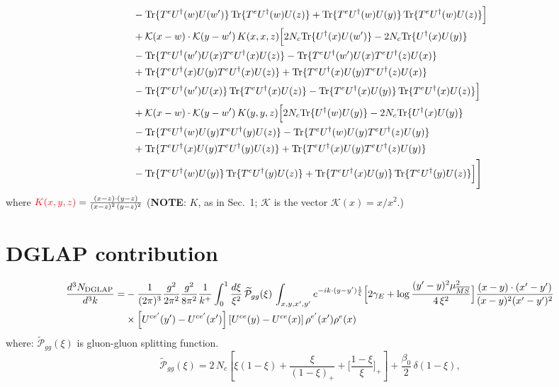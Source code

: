 \documentclass[9pt]{article}
\numberwithin{equation}{section}
\newcommand{\NOTE}{{\color{red}\textbf{NOTE}}}
\begin{document}
\begin{align}
&-{\rm Tr}\{T^eU^\dagger(w)U(w')\}\,{\rm Tr}\{T^eU^\dagger(w)U(z)\}+{\rm Tr}\{T^eU^\dagger(w)U(y)\}\,{\rm Tr}\{T^eU^\dagger(w)U(z)\}\Big]\notag\\
&+\mathcal K(x-w)\cdot\mathcal K(y-w')\,K(x,x,z)\Big[2 N_{c}{\rm Tr}\{U^\dagger(x)U(w')\}-2 N_{c}{\rm Tr}\{U^\dagger(x)U(y)\}\notag\\
&-{\rm Tr}\{T^eU^\dagger(w')U(x)T^eU^\dagger(x)U(z)\}-{\rm Tr}\{T^eU^\dagger(w')U(x)T^eU^\dagger(z)U(x)\}\notag\\
&+{\rm Tr}\{T^eU^\dagger(x)U(y)T^eU^\dagger(x)U(z)\}+{\rm Tr}\{T^eU^\dagger(x)U(y)T^eU^\dagger(z)U(x)\}\notag\\
&-{\rm Tr}\{T^eU^\dagger(w')U(x)\}\,{\rm Tr}\{T^eU^\dagger(x)U(z)\}-{\rm Tr}\{T^eU^\dagger(x)U(y)\}\,{\rm Tr}\{T^eU^\dagger(x)U(z)\}\Big]\notag\\
&+\mathcal K(x-w)\cdot\mathcal K(y-w')\,K(y,y,z)\Big[2 N_{c}{\rm Tr}\{U^\dagger(w)U(y)\}-2 N_{c}{\rm Tr}\{U^\dagger(x)U(y)\}\notag\\
&-{\rm Tr}\{T^eU^\dagger(w)U(y)T^eU^\dagger(y)U(z)\}-{\rm Tr}\{T^eU^\dagger(w)U(y)T^eU^\dagger(z)U(y)\}\notag\\
&+{\rm Tr}\{T^eU^\dagger(x)U(y)T^eU^\dagger(y)U(z)\}+{\rm Tr}\{T^eU^\dagger(x)U(y)T^eU^\dagger(z)U(y)\}\notag\\
&-{\rm Tr}\{T^eU^\dagger(w)U(y)\}\,{\rm Tr}\{T^eU^\dagger(y)U(z)\}+{\rm Tr}\{T^eU^\dagger(x)U(y)\}\,{\rm Tr}\{T^eU^\dagger(y)U(z)\}\Big]\Bigg]
\end{align}
where ${\color{red}K(x,y,z)} = \frac{(x-z)\cdot (y-z)}{(x-z)^{2}\,(y-z)^{2}}$ {\color{red}(\NOTE: $K$, as in Sec.~1; $\mathcal{K}$ is the vector $\mathcal{K}(x)=x/x^{2}$.)}
\section{DGLAP contribution}
\begin{align}
\frac{d^{3}N_{\rm DGLAP}}{d^{3}k}= &-\frac{1}{(2\pi)^{3}}\frac{g^{2}}{2\pi^{2}}\frac{g^{2}}{8\pi^{2}}\frac{1}{k^{+}}\int_{0}^{1}\frac{d\xi}{\xi^{2}}\,\widetilde{\mathcal P}_{gg}(\xi)\,\int_{x,y,x',y'}e^{-ik\cdot(y-y')\frac{1}{\xi}}\Big[2\gamma_{E}+\log\frac{(y'-y)^{2}\mu^{2}_{\overline{MS}}}{4\,\xi^{2}}\Big]\frac{(x-y)\cdot(x'-y')}{(x-y)^{2}(x'-y')^{2}}\notag\\
&\times\left[U^{ce'}(y') - U^{ce'}(x')\right]\left[U^{ce}(y) - U^{ce}(x)\right]\rho^{e'}(x')\rho^{e}(x)
\end{align}
where:
$\widetilde{\mathcal{P}}_{gg}(\xi)$ is gluon-gluon splitting function.
$$\widetilde{\mathcal{P}}_{gg}(\xi) = 2\,N_{c}\left[\xi(1-\xi) + \frac{\xi}{(1-\xi)_{+}} + \Big[\frac{1-\xi}{\xi}\Big]_{+}\right]+\frac{\beta_{0}}{2}\,\delta(1-\xi),$$
\end{document}
